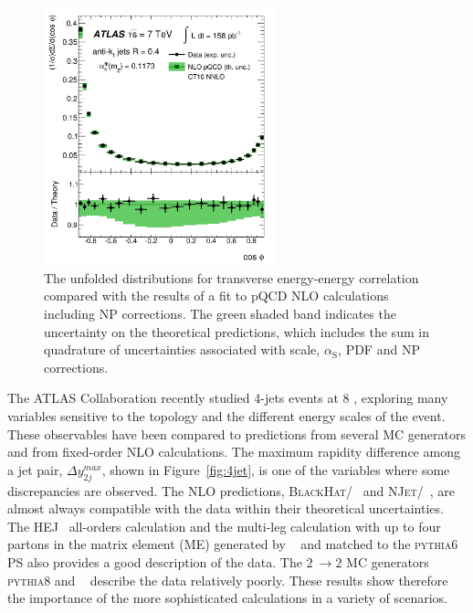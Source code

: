 \documentclass{PoS}
\providecommand{\NJET} {{\textsc{NJet}}\xspace}
\providecommand{\BLACKHAT} {{\textsc{BlackHat}}\xspace}
\providecommand{\HEJ} {{\textsc{HEJ}}\xspace}
\def\as{\ensuremath{\alpha_\mathrm{S}}\xspace}
\providecommand{\PYTHIAS} {{\textsc{pythia6}}\xspace}
\providecommand{\PYTHIAE} {{\textsc{pythia8}}\xspace}
\begin{document}
\begin{figure}[hbpt]
  \centering
  \includegraphics[width=0.6\textwidth]{Figure5.pdf}
  \caption{The unfolded distributions for transverse energy-energy correlation compared with the results of a fit to
    pQCD NLO calculations including NP corrections. The green shaded band indicates the uncertainty on the
    theoretical predictions, which includes the sum in quadrature of uncertainties associated with scale, \as, PDF and
    NP corrections.}
  \label{fig:TEEC}
\end{figure}

The ATLAS Collaboration recently studied 4-jets events at 8 \TeV\cite{Aad:2015nda}, exploring many variables sensitive to the topology and the
different energy scales of the event. These observables have been compared to predictions from several MC
generators and from fixed-order NLO calculations. The maximum rapidity difference among a jet pair, $\Delta
y_{2j}^{max}$, shown in Figure~\ref{fig:4jet}, is one of the variables where some discrepancies are observed. 
The NLO predictions, \BLACKHAT/\SHERPA~\cite{Berger:2008sj,Bern:2011ep} and
\NJET/\SHERPA~\cite{Badger:2012pg,Badger:2012pf}, are almost always compatible with the data within their 
theoretical uncertainties. The \HEJ~\cite{Andersen:2009nu,Andersen:2011hs} all-orders calculation and the multi-leg calculation with up to four partons in the
matrix element (ME) generated by \MADGRAPH~\cite{Alwall:2014hca} and matched to the \PYTHIAS~\cite{Sjostrand:2006za} PS also provides a good description of
the data. The $2\ \to 2$ MC generators \PYTHIAE and \HERWIGpp~\cite{Bahr:2008pv}
 describe the data relatively poorly. These results show therefore 
the importance of the more sophisticated calculations in a variety of scenarios. 
\end{document}
